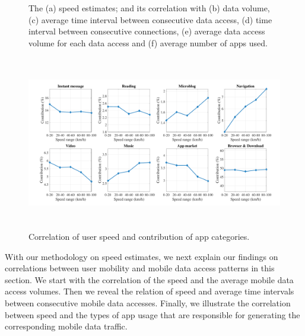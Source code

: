 \begin{figure}[ht]
    \vspace{-0.1in}
    \caption{The (a) speed estimates; and its correlation with (b) data volume, (c) average time interval between consecutive data access, (d) time interval between consecutive connections, (e) average data access volume for each data access and (f) average number of apps used.}
    \label{fig:speed_corr}
\end{figure}

\begin{figure}[!ht]
    \centering
    \includegraphics[width=\linewidth,height=3in]{./figures/large_font/speed_appcat.pdf}
    \vspace{-0.3in}
    \caption{Correlation of user speed and contribution of app categories.}
    \label{fig:speed_appcat}
\end{figure}

With our methodology on speed estimates, we next explain our findings on correlations between user mobility and mobile data access patterns in this section. We start with the correlation of the speed and the average mobile data access volumes. Then we reveal the relation of speed and average time intervals between consecutive mobile data accesses. Finally, we illustrate the correlation between speed and the types of app usage that are responsible for generating the corresponding mobile data traffic.

